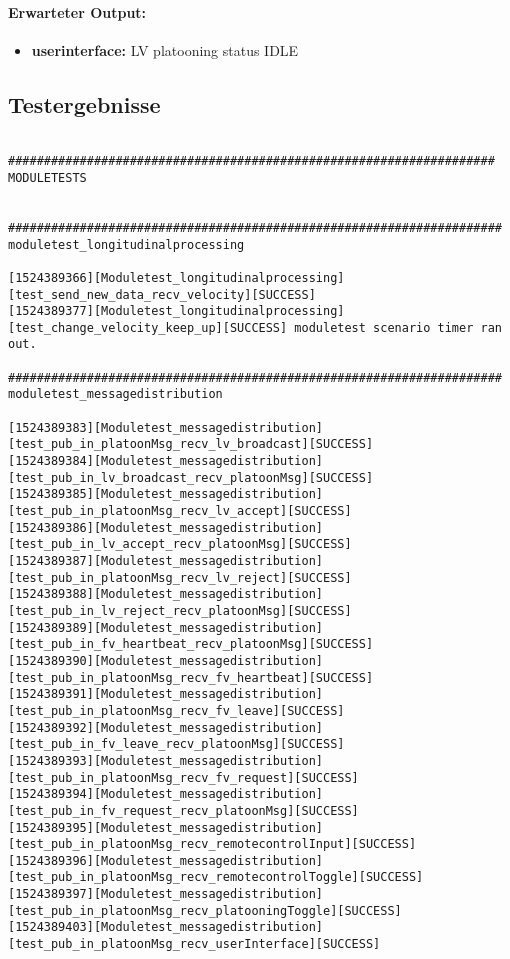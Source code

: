 \documentclass[a4paper, 12pt, titlepage]{scrartcl}
\begin{document}
{			\paragraph{Erwarteter Output:}
			\begin{itemize} \itemsep-0.5em
				\item \textbf{userinterface:} LV platooning status IDLE
			\end{itemize}

		\subsection{Testergebnisse}
		\label{test_ergebnisse}

		\begin{lstlisting}[basicstyle=\tiny]

####################################################################
MODULETESTS


#####################################################################
moduletest_longitudinalprocessing

[1524389366][Moduletest_longitudinalprocessing][test_send_new_data_recv_velocity][SUCCESS] 
[1524389377][Moduletest_longitudinalprocessing][test_change_velocity_keep_up][SUCCESS] moduletest scenario timer ran out.

#####################################################################
moduletest_messagedistribution

[1524389383][Moduletest_messagedistribution][test_pub_in_platoonMsg_recv_lv_broadcast][SUCCESS] 
[1524389384][Moduletest_messagedistribution][test_pub_in_lv_broadcast_recv_platoonMsg][SUCCESS] 
[1524389385][Moduletest_messagedistribution][test_pub_in_platoonMsg_recv_lv_accept][SUCCESS] 
[1524389386][Moduletest_messagedistribution][test_pub_in_lv_accept_recv_platoonMsg][SUCCESS] 
[1524389387][Moduletest_messagedistribution][test_pub_in_platoonMsg_recv_lv_reject][SUCCESS] 
[1524389388][Moduletest_messagedistribution][test_pub_in_lv_reject_recv_platoonMsg][SUCCESS] 
[1524389389][Moduletest_messagedistribution][test_pub_in_fv_heartbeat_recv_platoonMsg][SUCCESS] 
[1524389390][Moduletest_messagedistribution][test_pub_in_platoonMsg_recv_fv_heartbeat][SUCCESS] 
[1524389391][Moduletest_messagedistribution][test_pub_in_platoonMsg_recv_fv_leave][SUCCESS] 
[1524389392][Moduletest_messagedistribution][test_pub_in_fv_leave_recv_platoonMsg][SUCCESS] 
[1524389393][Moduletest_messagedistribution][test_pub_in_platoonMsg_recv_fv_request][SUCCESS] 
[1524389394][Moduletest_messagedistribution][test_pub_in_fv_request_recv_platoonMsg][SUCCESS] 
[1524389395][Moduletest_messagedistribution][test_pub_in_platoonMsg_recv_remotecontrolInput][SUCCESS] 
[1524389396][Moduletest_messagedistribution][test_pub_in_platoonMsg_recv_remotecontrolToggle][SUCCESS] 
[1524389397][Moduletest_messagedistribution][test_pub_in_platoonMsg_recv_platooningToggle][SUCCESS] 
[1524389403][Moduletest_messagedistribution][test_pub_in_platoonMsg_recv_userInterface][SUCCESS] 


\end{lstlisting}}
\end{document}
